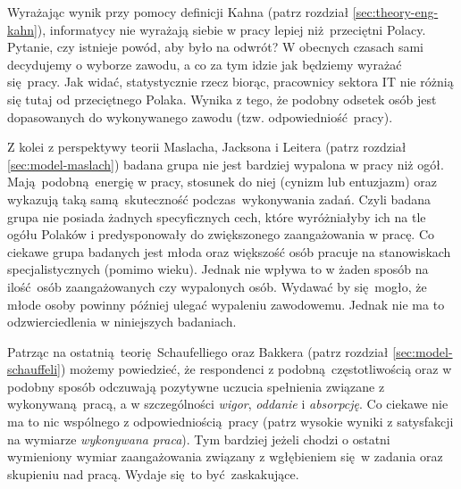 Wyrażając wynik przy pomocy definicji Kahna (patrz rozdział \ref{sec:theory-eng-kahn}), informatycy nie wyrażają siebie w pracy lepiej niż przeciętni Polacy. Pytanie, czy istnieje powód, aby było na odwrót? W obecnych czasach sami decydujemy o wyborze zawodu, a co za tym idzie jak będziemy wyrażać się pracy. Jak widać, statystycznie rzecz biorąc, pracownicy sektora IT nie różnią się tutaj od przeciętnego Polaka. Wynika z tego, że podobny odsetek osób jest dopasowanych do
wykonywanego zawodu (tzw. odpowiedniość pracy).

Z kolei z perspektywy teorii Maslacha, Jacksona i Leitera (patrz rozdział \ref{sec:model-maslach}) badana grupa nie jest bardziej wypalona w pracy niż ogół. Mają podobną energię w pracy, stosunek do niej (cynizm lub entuzjazm) oraz wykazują taką samą skuteczność podczas wykonywania zadań. Czyli badana grupa nie posiada żadnych specyficznych cech, które wyróżniałyby ich na tle ogółu Polaków i predysponowały do zwiększonego zaangażowania w pracę. Co ciekawe grupa badanych
jest młoda oraz większość osób pracuje na stanowiskach specjalistycznych (pomimo wieku). Jednak nie wpływa to w żaden sposób na
ilość osób zaangażowanych czy wypalonych osób. Wydawać by się mogło, że młode osoby powinny później ulegać wypaleniu zawodowemu. Jednak nie ma to odzwierciedlenia w niniejszych badaniach.

Patrząc na ostatnią teorię Schaufelliego oraz Bakkera (patrz rozdział \ref{sec:model-schauffeli}) możemy powiedzieć, że respondenci z podobną częstotliwością oraz w podobny sposób odczuwają pozytywne uczucia spełnienia związane z wykonywaną pracą, a w szczególności \textit{wigor}, \textit{oddanie} i \textit{absorpcję}. Co ciekawe nie ma to nic wspólnego z odpowiedniością pracy (patrz wysokie wyniki z satysfakcji na wymiarze \textit{wykonywana praca}). Tym bardziej
jeżeli chodzi o ostatni wymieniony wymiar zaangażowania związany z wgłębieniem się w zadania oraz skupieniu nad pracą. Wydaje się to być zaskakujące.
